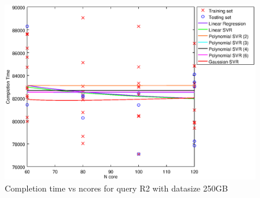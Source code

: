 
\begin {figure}[hbtp]
\centering
\includegraphics[width=\textwidth]{output/R2_250_1_OVER_NCORES/plot_R2_250.eps}
\caption{Completion time vs ncores for query R2 with datasize 250GB}
\label{fig:all_nonlinear_R2_250}
\end {figure}
